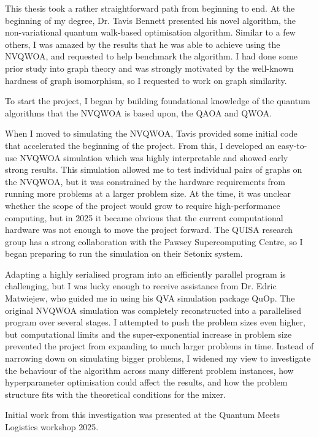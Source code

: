 This thesis took a rather straightforward path from beginning to end. At the beginning of my degree, Dr. Tavis Bennett presented his novel algorithm, the non-variational quantum walk-based optimisation algorithm. Similar to a few others, I was amazed by the results that he was able to achieve using the NVQWOA, and requested to help benchmark the algorithm. I had done some prior study into graph theory and was strongly motivated by the well-known hardness of graph isomorphism, so I requested to work on graph similarity.

To start the project, I began by building foundational knowledge of the quantum algorithms that the NVQWOA is based upon, the QAOA and QWOA. 

When I moved to simulating the NVQWOA, Tavis provided some initial code that accelerated the beginning of the project. From this, I developed an easy-to-use NVQWOA simulation which was highly interpretable and showed early strong results. This simulation allowed me to test individual pairs of graphs on the NVQWOA, but it was constrained by the hardware requirements from running more problems at a larger problem size. At the time, it was unclear whether the scope of the project would grow to require high-performance computing, but in 2025 it became obvious that the current computational hardware was not enough to move the project forward. The QUISA research group has a strong collaboration with the Pawsey Supercomputing Centre, so I began preparing to run the simulation on their Setonix system.

Adapting a highly serialised program into an efficiently parallel program is challenging, but I was lucky enough to receive assistance from Dr. Edric Matwiejew, who guided me in using his QVA simulation package QuOp. The original NVQWOA simulation was completely reconstructed into a parallelised program over several stages. I attempted to push the problem sizes even higher, but computational limits and the super-exponential increase in problem size prevented the project from expanding to much larger problems in time. Instead of narrowing down on simulating bigger problems, I widened my view to investigate the behaviour of the algorithm across many different problem instances, how hyperparameter optimisation could affect the results, and how the problem structure fits with the theoretical conditions for the mixer.

Initial work from this investigation was presented at the Quantum Meets Logistics workshop 2025.